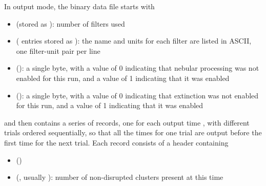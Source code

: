 \documentclass[letterpaper,10pt,english]{sphinxmanual}
\begin{document}
In  output mode, the binary data file starts with
\begin{itemize}
\item {} 
 (stored as ): number of filters used

\item {} 
  ( entries stored as ): the name and units for each filter are listed in ASCII, one filter-unit pair per line

\item {} 
 (): a single byte, with a value of 0 indicating that nebular processing was not enabled for this run, and a value of 1 indicating that it was enabled

\item {} 
 (): a single byte, with a value of 0 indicating that extinction was not enabled for this run, and a value of 1 indicating that it was enabled

\end{itemize}

and then contains a series of records, one for each output time , with different trials ordered sequentially, so that all the times for one trial are output before the first time for the next trial. Each record consists of a header containing
\begin{itemize}
\item {} 
 ()

\item {} 
 (, usually ): number of non-disrupted clusters present at this time

\end{itemize}
\end{document}
